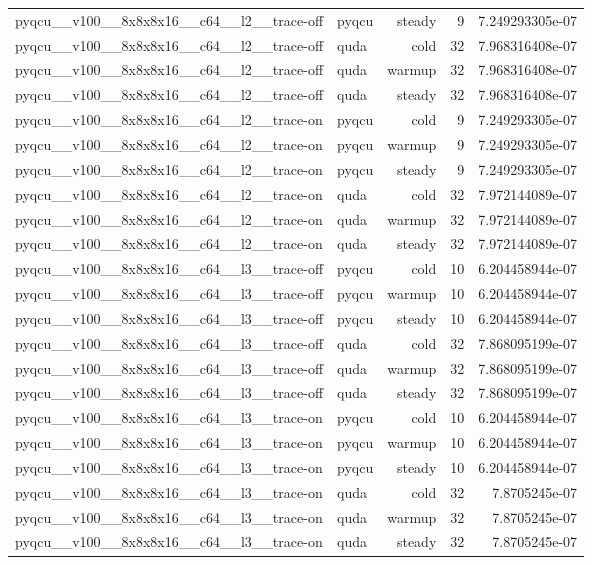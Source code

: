 \begin{table}[htbp]
\begin{tabular}{@{}llrrr@{}}
pyqcu\_\_v100\_\_8x8x8x16\_\_c64\_\_l2\_\_trace-off & pyqcu & steady & 9 & 7.249293305e-07 \\
pyqcu\_\_v100\_\_8x8x8x16\_\_c64\_\_l2\_\_trace-off & quda & cold & 32 & 7.968316408e-07 \\
pyqcu\_\_v100\_\_8x8x8x16\_\_c64\_\_l2\_\_trace-off & quda & warmup & 32 & 7.968316408e-07 \\
pyqcu\_\_v100\_\_8x8x8x16\_\_c64\_\_l2\_\_trace-off & quda & steady & 32 & 7.968316408e-07 \\
pyqcu\_\_v100\_\_8x8x8x16\_\_c64\_\_l2\_\_trace-on & pyqcu & cold & 9 & 7.249293305e-07 \\
pyqcu\_\_v100\_\_8x8x8x16\_\_c64\_\_l2\_\_trace-on & pyqcu & warmup & 9 & 7.249293305e-07 \\
pyqcu\_\_v100\_\_8x8x8x16\_\_c64\_\_l2\_\_trace-on & pyqcu & steady & 9 & 7.249293305e-07 \\
pyqcu\_\_v100\_\_8x8x8x16\_\_c64\_\_l2\_\_trace-on & quda & cold & 32 & 7.972144089e-07 \\
pyqcu\_\_v100\_\_8x8x8x16\_\_c64\_\_l2\_\_trace-on & quda & warmup & 32 & 7.972144089e-07 \\
pyqcu\_\_v100\_\_8x8x8x16\_\_c64\_\_l2\_\_trace-on & quda & steady & 32 & 7.972144089e-07 \\
pyqcu\_\_v100\_\_8x8x8x16\_\_c64\_\_l3\_\_trace-off & pyqcu & cold & 10 & 6.204458944e-07 \\
pyqcu\_\_v100\_\_8x8x8x16\_\_c64\_\_l3\_\_trace-off & pyqcu & warmup & 10 & 6.204458944e-07 \\
pyqcu\_\_v100\_\_8x8x8x16\_\_c64\_\_l3\_\_trace-off & pyqcu & steady & 10 & 6.204458944e-07 \\
pyqcu\_\_v100\_\_8x8x8x16\_\_c64\_\_l3\_\_trace-off & quda & cold & 32 & 7.868095199e-07 \\
pyqcu\_\_v100\_\_8x8x8x16\_\_c64\_\_l3\_\_trace-off & quda & warmup & 32 & 7.868095199e-07 \\
pyqcu\_\_v100\_\_8x8x8x16\_\_c64\_\_l3\_\_trace-off & quda & steady & 32 & 7.868095199e-07 \\
pyqcu\_\_v100\_\_8x8x8x16\_\_c64\_\_l3\_\_trace-on & pyqcu & cold & 10 & 6.204458944e-07 \\
pyqcu\_\_v100\_\_8x8x8x16\_\_c64\_\_l3\_\_trace-on & pyqcu & warmup & 10 & 6.204458944e-07 \\
pyqcu\_\_v100\_\_8x8x8x16\_\_c64\_\_l3\_\_trace-on & pyqcu & steady & 10 & 6.204458944e-07 \\
pyqcu\_\_v100\_\_8x8x8x16\_\_c64\_\_l3\_\_trace-on & quda & cold & 32 & 7.8705245e-07 \\
pyqcu\_\_v100\_\_8x8x8x16\_\_c64\_\_l3\_\_trace-on & quda & warmup & 32 & 7.8705245e-07 \\
pyqcu\_\_v100\_\_8x8x8x16\_\_c64\_\_l3\_\_trace-on & quda & steady & 32 & 7.8705245e-07 \\
\bottomrule
\end{tabular}
\end{table}

